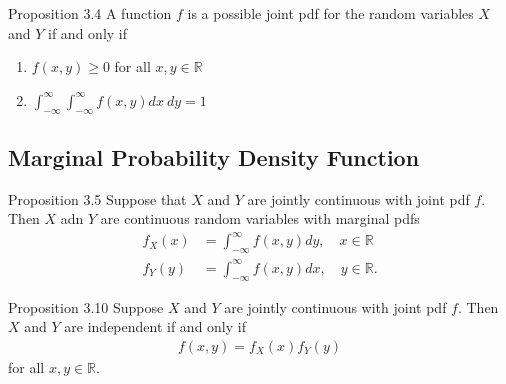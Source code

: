 
\begin{boks}{Proposition 3.4}
A function $f$ is a possible joint pdf for the random variables $X$ and $Y$ if and only if
\begin{enumerate}
    \item $f(x, y) \geq 0$ for all $x,y \in \mathbb{R}$
    \item $\int_{-\infty}^\infty \int_{-\infty}^\infty f(x,y)dx\  dy = 1$
\end{enumerate}
\end{boks}
\subsection{Marginal Probability Density Function}

\begin{boks}{Proposition 3.5}
Suppose that $X$ and $Y$ are jointly continuous with joint pdf $f$. Then $X$ adn $Y$ are continuous random variables with marginal pdfs
\begin{align*}
    f_X(x) &= \int_{-\infty}^\infty f(x, y) dy, \quad x\in\mathbb{R} \\
    f_Y(y) &= \int_{-\infty}^\infty f(x,y) dx, \quad y\in\mathbb{R}.
\end{align*}
\end{boks}

\begin{boks}{Proposition 3.10}
  Suppose $X$ and $Y$ are jointly continuous with joint pdf $f$.
  Then $X$ and $Y$ are independent if and only if
  \begin{align*}
    f(x,y) = f_X(x)f_Y(y)
  \end{align*}
  for all $x,y \in \mathbb{R}$.
\end{boks}


